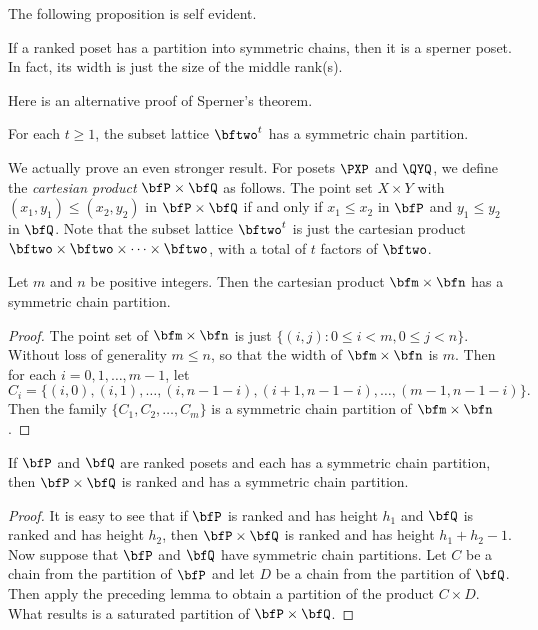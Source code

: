 The following proposition is self evident.

\begin{proposition}\label{prop:symmchain-sperner}
If a ranked poset has a partition into symmetric chains,
then it is a sperner poset.  In fact, its width is
just the size of the middle rank(s).
\end{proposition}

Here is an alternative proof of Sperner's theorem.

\begin{theorem}\label{thm:subset-lattice-symmchain}
For each $t\ge1$, the subset lattice $\bftwo^t$ has a symmetric chain
partition.
\end{theorem}

We actually prove an even stronger result.  For posets $\PXP$ and
$\QYQ$, we define the \textit{cartesian product} $\bfP\times \bfQ$ as
follows.  The point set $X\times Y$ with $(x_1,y_1)\le (x_2,y_2)$ in
$\bfP\times \bfQ$ if and only if $x_1\le x_2$ in $\bfP$ and $y_1\le
y_2$ in $\bfQ$.  Note that the subset lattice $\bftwo^t$ is just the
cartesian product $\bftwo\times\bftwo\times\dots\times\bftwo$, with a total
of $t$ factors of $\bftwo$.

\begin{lemma}\label{lem:prodchain-symmchain}
Let $m$ and $n$ be positive integers.  Then
the cartesian product $\bfm\times\bfn$ has
a symmetric chain partition.
\end{lemma}

\begin{proof}
The point set of $\bfm\times\bfn$ is just
$\{(i,j):0\le i <m, 0\le j<n\}$.  
Without loss of generality $m\le n$, so that
the width of $\bfm\times\bfn$ is $m$.  Then
for each $i=0,1,\dots,m-1$, let 
\[
C_i=\{(i,0),(i,1),\dots,(i,n-1-i),(i+1,n-1-i),\dots,(m-1,n-1-i)\}.
\]
Then the family $\{C_1,C_2,\dots,C_m\}$ is
a symmetric chain partition of $\bfm\times\bfn$.
\end{proof}

\begin{theorem}\label{thm:ranked-prod-symmchain}
If $\bfP$ and $\bfQ$ are ranked posets and each has
a symmetric chain partition, then $\bfP\times\bfQ$
is ranked and has a symmetric chain partition.
\end{theorem}

\begin{proof}
It is easy to see that if $\bfP$ is ranked and has
height $h_1$ and $\bfQ$ is ranked and has height $h_2$,
then $\bfP\times\bfQ$ is ranked and has height
$h_1+h_2-1$.  Now suppose that $\bfP$ and $\bfQ$ have
symmetric chain partitions.  Let $C$ be a chain from
the partition of $\bfP$ and let $D$ be a chain from
the partition of $\bfQ$.  Then apply the preceding lemma
to obtain a partition of the product $C\times D$.
What results is a saturated partition of $\bfP\times
\bfQ$.
\end{proof}

